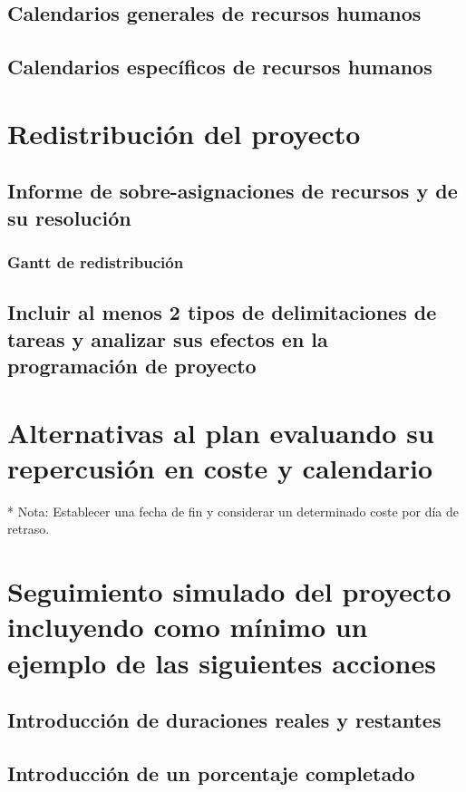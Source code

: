 \documentclass[11pt,a4paper,spanish,twoside]{report}
\begin{document}
\section{Calendarios generales de recursos humanos}

\section{Calendarios específicos de recursos humanos}

\chapter{Redistribución del proyecto}
\section{Informe de sobre-asignaciones de recursos y de su 
  resolución}
\subsection{Gantt de redistribución}

\section{Incluir al menos 2 tipos de delimitaciones de tareas y 
  analizar sus efectos en la programación de proyecto}

\chapter{Alternativas al plan evaluando su repercusión en coste y 
  calendario}
* Nota: Establecer una fecha de fin y considerar un determinado coste por día
de retraso.

\chapter{Seguimiento simulado del proyecto incluyendo como 
  mínimo un ejemplo de las siguientes acciones}
\section{Introducción de duraciones reales y restantes}

\section{Introducción de un porcentaje completado}
\end{document}
